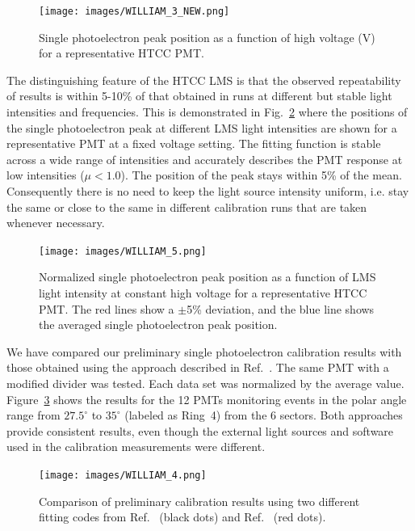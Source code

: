 \begin{figure}[ht]
\centering
\texttt{[image: images/WILLIAM\_3\_NEW.png]}
\caption{Single photoelectron peak position as a function of high voltage (V) for a representative HTCC PMT.}
\label{fig:WILLIAM_3_NEW}
\end{figure}

The distinguishing feature of the HTCC LMS is that the observed repeatability of results is within 5-10\% of that
obtained in runs at different but stable light intensities and frequencies. This is demonstrated in
Fig.~\ref{fig:WILLIAM_5} where the positions of the single photoelectron peak at different LMS light
intensities are shown for a representative PMT at a fixed voltage setting. The fitting function is stable across a
wide range of intensities and accurately describes the PMT response at low intensities ($\mu<1.0$). The position of
the peak stays within 5\% of the mean. Consequently there is no need to keep the light source intensity uniform, i.e.
stay the same or close to the same in different calibration runs that are taken whenever necessary.

\begin{figure}[ht]
\centering
\texttt{[image: images/WILLIAM\_5.png]}
\caption{Normalized single photoelectron peak position as a function of LMS light intensity at constant high voltage for a
  representative HTCC PMT. The red lines show a $\pm$5\% deviation, and the blue line shows the averaged
  single photoelectron peak position.}
\label{fig:WILLIAM_5}
\end{figure}

We have compared our preliminary single photoelectron calibration results with those obtained using the
approach described in Ref.~\cite{degtiarenko2017}. The same PMT with a modified divider was tested. Each data
set was normalized by the average value. Figure~\ref{fig:WILLIAM_4} shows the results for the 12 PMTs monitoring
events in the polar angle range from $27.5^\circ$ to $35^\circ$ (labeled as Ring~4) from the 6 sectors. Both approaches
provide consistent results, even though the external light sources and software used in the calibration measurements
were different.

\begin{figure}[ht]
\centering
\texttt{[image: images/WILLIAM\_4.png]}
\caption{Comparison of preliminary calibration results using two different fitting codes from
  Ref.~\cite{bellamy1996} (black dots) and Ref.~\cite{degtiarenko2017} (red dots).}
\label{fig:WILLIAM_4}
\end{figure}

